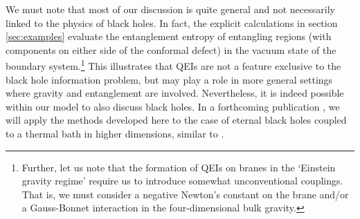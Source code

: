 We must note that most of our discussion is quite general and not necessarily linked to the physics of black holes. In fact, the explicit calculations in section \ref{sec:examples} evaluate the entanglement entropy of entangling regions (with components on either side of the conformal defect) in the vacuum state of the boundary system.\footnote{Further, let us note that the formation of QEIs on branes in the `Einstein gravity regime' require us to introduce somewhat unconventional couplings. That is, we must consider a negative Newton's constant on the brane and/or a Gauss-Bonnet interaction in the four-dimensional bulk gravity.} This illustrates that QEIs are not a feature exclusive to the black hole information problem, but may play a role in more general settings where gravity and entanglement are involved. Nevertheless, it is indeed possible within our model to also discuss black holes. In a forthcoming publication \cite{QEI}, we will apply the methods developed here to the case of eternal black holes coupled to a thermal bath in higher dimensions, similar to \cite{Almheiri:2019yqk}. 



